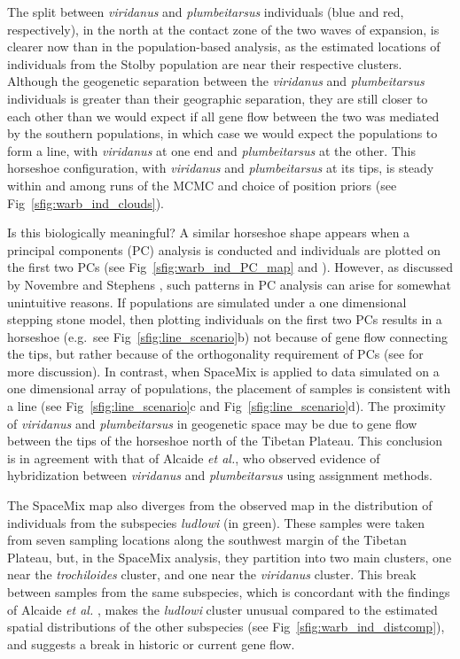 \documentclass[10pt,letterpaper]{article}
\begin{document}
The split between \textit{viridanus} and \textit{plumbeitarsus} individuals (blue and red, respectively), in the north at the contact zone of the two waves of expansion, is clearer now than in the population-based analysis, as the estimated locations of individuals from the Stolby population are near their respective clusters. 
Although the geogenetic separation between the \textit{viridanus} and \textit{plumbeitarsus} individuals is greater than their geographic separation, 
they are still closer to each other than we would expect if all gene flow between the two was mediated by the southern populations,
in which case we would expect the populations to form a line, 
with \textit{viridanus} at one end and \textit{plumbeitarsus} at the other. 
This horseshoe configuration, with \textit{viridanus} and \textit{plumbeitarsus} at its tips, is steady within and among runs of the MCMC and choice of position priors (see Fig\ \ref{sfig:warb_ind_clouds}).  

Is this biologically meaningful?  A similar horseshoe shape appears when a principal components (PC) analysis is conducted and individuals are plotted on the first two PCs (see Fig\ \ref{sfig:warb_ind_PC_map} and \cite{alcaide2014genomic}).  
However, as discussed by Novembre and Stephens \cite{novembre_interpreting_2008}, such patterns in PC analysis can arise for somewhat unintuitive reasons. If populations are simulated under a one dimensional stepping stone model, then plotting individuals on the first two PCs results in a horseshoe (e.g.\ see Fig\ \ref{sfig:line_scenario}b) not because of gene flow connecting the tips, but rather because of the orthogonality requirement of PCs (see \cite{novembre_interpreting_2008} for more discussion).  In contrast, when SpaceMix is applied to data simulated on a one dimensional array of populations, the placement of samples is consistent with a line (see Fig\ \ref{sfig:line_scenario}c and Fig\ \ref{sfig:line_scenario}d). The proximity of \textit{viridanus} and \textit{plumbeitarsus} in geogenetic space may be due to gene flow between the tips of the horseshoe north of the Tibetan Plateau. This conclusion is in agreement with that of Alcaide \emph{et al.}\cite{alcaide2014genomic}, who observed evidence of hybridization between \textit{viridanus} and \textit{plumbeitarsus} using assignment methods.

The SpaceMix map also diverges from the observed map in the distribution of individuals from the subspecies \textit{ludlowi} (in green).  These samples were taken from seven sampling locations along the southwest margin of the Tibetan Plateau, but, in the SpaceMix analysis, they partition into two main clusters, one near the \textit{trochiloides} cluster, and one near the \textit{viridanus} cluster.  This break between samples from the same subspecies, which is concordant with the findings of Alcaide \emph{et al.} \cite{alcaide2014genomic}, makes the \textit{ludlowi} cluster unusual compared to the estimated spatial distributions of the other subspecies (see Fig\ \ref{sfig:warb_ind_distcomp}), and suggests a break in historic or current gene flow.
\end{document}
